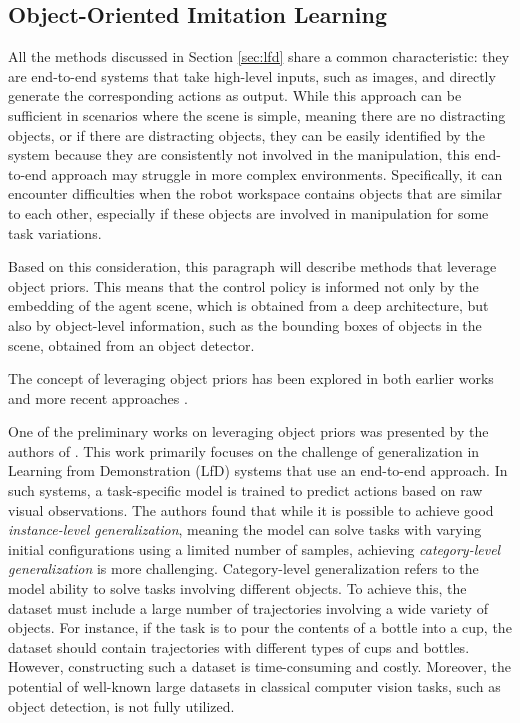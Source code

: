 \subsection{Object-Oriented Imitation Learning}
\label{sec:ooil}
All the methods discussed in Section \ref{sec:lfd} share a common characteristic: they are end-to-end systems that take high-level inputs, such as images, and directly generate the corresponding actions as output. While this approach can be sufficient in scenarios where the scene is simple, meaning there are no distracting objects, or if there are distracting objects, they can be easily identified by the system because they are consistently not involved in the manipulation, this end-to-end approach may struggle in more complex environments. Specifically, it can encounter difficulties when the robot workspace contains objects that are similar to each other, especially if these objects are involved in manipulation for some task variations.

Based on this consideration, this paragraph will describe methods that leverage object priors. This means that the control policy is informed not only by the embedding of the agent scene, which is obtained from a deep architecture, but also by object-level information, such as the bounding boxes of objects in the scene, obtained from an object detector.

The concept of leveraging object priors has been explored in both earlier works \cite{devin2018deep,park2021object} and more recent approaches \cite{belkhale2023plato,zhu2023viola,zhu2023learning,jiang2023vima}.

One of the preliminary works on leveraging object priors was presented by the authors of \cite{devin2018deep}. This work primarily focuses on the challenge of generalization in Learning from Demonstration (LfD) systems that use an end-to-end approach. In such systems, a task-specific model is trained to predict actions based on raw visual observations. The authors found that while it is possible to achieve good \textit{instance-level generalization}, meaning the model can solve tasks with varying initial configurations using a limited number of samples, achieving \textit{category-level generalization} is more challenging. Category-level generalization refers to the model ability to solve tasks involving different objects. To achieve this, the dataset must include a large number of trajectories involving a wide variety of objects. For instance, if the task is to pour the contents of a bottle into a cup, the dataset should contain trajectories with different types of cups and bottles. However, constructing such a dataset is time-consuming and costly. Moreover, the potential of well-known large datasets in classical computer vision tasks, such as object detection, is not fully utilized.

